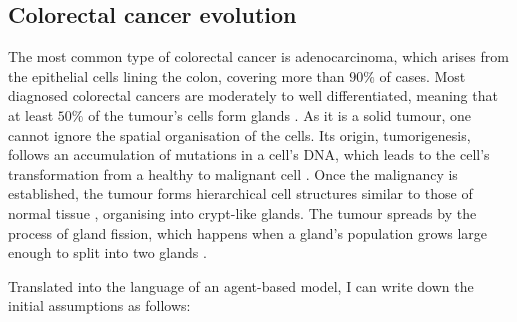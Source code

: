 \subsection{Colorectal cancer evolution}\label{section:assumptions:general}

The most common type of colorectal cancer is adenocarcinoma, which arises from the epithelial cells lining
the colon, covering more than $90\%$ of cases. Most diagnosed
colorectal cancers are moderately to well differentiated, meaning that at least $50\%$ of the tumour's cells
form glands \cite{fleming_colorectal_2012}.
As it is a solid tumour, one cannot ignore the spatial organisation of the cells. Its
origin, tumorigenesis, follows an accumulation of mutations in a cell's DNA, which leads to the cell's transformation
from a healthy to malignant cell \cite{fearon_genetic_1990}. Once the malignancy is established, the tumour
forms hierarchical cell structures similar to those of normal tissue \cite{cernat_colorectal_2014}, organising
into crypt-like glands. The tumour spreads by the process of gland fission, which happens when a gland's
population grows large enough to split into two glands \cite{preston_bottom-up_2003}. \par
Translated into the language of an agent-based model, I can write down the initial assumptions as follows:
